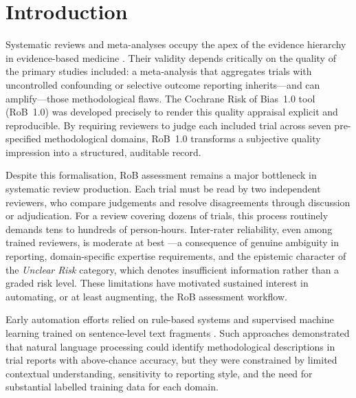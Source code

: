 \documentclass[../main.tex]{subfiles}
\begin{document}
\section{Introduction}
\label{sec:introduction}

Systematic reviews and meta-analyses occupy the apex of the evidence hierarchy in
evidence-based medicine \citep{Higgins2019}.
Their validity depends critically on the quality of the primary studies included:
a meta-analysis that aggregates trials with uncontrolled confounding or selective
outcome reporting inherits---and can amplify---those methodological flaws.
The Cochrane Risk of Bias~1.0 tool (RoB~1.0) \citep{Higgins2011} was developed
precisely to render this quality appraisal explicit and reproducible.
By requiring reviewers to judge each included trial across seven pre-specified
methodological domains, RoB~1.0 transforms a subjective quality impression into a
structured, auditable record.

Despite this formalisation, RoB assessment remains a major bottleneck in systematic
review production.
Each trial must be read by two independent reviewers, who compare judgements and
resolve disagreements through discussion or adjudication.
For a review covering dozens of trials, this process routinely demands tens to
hundreds of person-hours.
Inter-rater reliability, even among trained reviewers, is moderate at best
\citep{Konsgen2020, ArmijoOlivo2014}---a consequence of genuine ambiguity in
reporting, domain-specific expertise requirements, and the epistemic character of
the \emph{Unclear Risk} category, which denotes insufficient information rather
than a graded risk level.
These limitations have motivated sustained interest in automating, or at least
augmenting, the RoB assessment workflow.

Early automation efforts relied on rule-based systems and supervised machine learning
trained on sentence-level text fragments \citep{Marshall2016}.
Such approaches demonstrated that natural language processing could identify
methodological descriptions in trial reports with above-chance accuracy, but they
were constrained by limited contextual understanding, sensitivity to reporting style,
and the need for substantial labelled training data for each domain.
\end{document}
